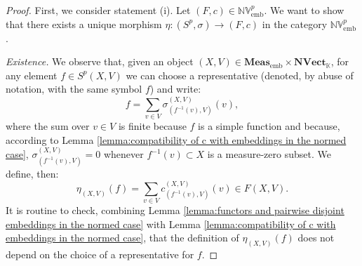 \documentclass{amsart}
\theoremstyle{definition}
\theoremstyle{plain}
\newcommand{\embMeas}{\mathbf{Meas}_\mathrm{emb}}
\newcommand{\NVect}{\mathbf{NVect}_{\mathbb{K}}}
\newcommand{\NVembp}{\mathbb{NV}_{\mathrm{emb}}^p}
\begin{document}
        \begin{proof} 
            First, we consider statement (i). 
            Let $(F,c) \in \NVembp$. 
            We want to show that there exists a unique morphism $\eta \colon (S^p,\sigma) \rightarrow (F,c)$ in the category $\NVembp$.

            \emph{Existence.}\hspace{.5em} We observe that, given an object $(X,V) \in \embMeas \times \NVect$, for any element $f \in S^p(X,V)$ we can choose a representative (denoted, by abuse of notation, with the same symbol $f$) and write:
            \begin{equation}
            \label{eq:expression of simple functions using sigma}
                f = \sum_{v \in V} \sigma_{\left( f^{-1}(v),V \right)}^{(X,V)}(v),
            \end{equation}
            where the sum over $v \in V$ is finite because $f$ is a simple function and because, according to Lemma \ref{lemma:compatibility of c with embeddings in the normed case}, $\sigma_{\left( f^{-1}(v),V \right)}^{(X,V)} = 0$ whenever $f^{-1}(v) \subset X$ is a measure-zero subset.
            We define, then:
            \begin{equation}
            \label{eq:definition of eta}
                \eta_{(X,V)}(f) = \sum_{v \in V} c_{(f^{-1}(v),V)}^{(X,V)}(v) \in F(X,V). 
            \end{equation}
            It is routine to check, combining Lemma \ref{lemma:functors and pairwise disjoint embeddings in the normed case} with Lemma \ref{lemma:compatibility of c with embeddings in the normed case}, that the definition of $\eta_{(X,V)}(f)$ does not depend on the choice of a representative for $f$.


\end{proof}
\end{document}
